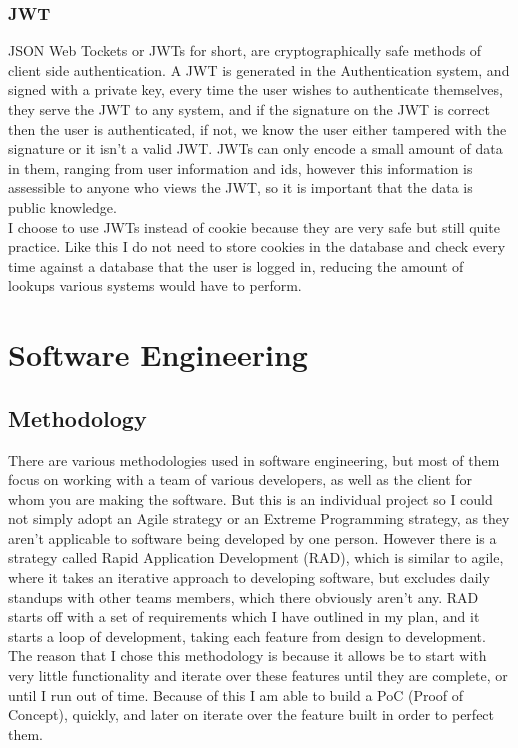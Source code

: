 \documentclass[titlepage]{article}
\begin{document}
\subsubsection{JWT}
JSON Web Tockets or JWTs for short, are cryptographically safe methods of client side authentication. A JWT is generated in the Authentication system, and signed with a private key, every time the user wishes to authenticate themselves, they serve the JWT to any system, and if the signature on the JWT is correct then the user is authenticated, if not, we know the user either tampered with the signature or it isn't a valid JWT. JWTs can only encode a small amount of data in them, ranging from user information and ids, however this information is assessible to anyone who views the JWT, so it is important that the data is public knowledge. \\

I choose to use JWTs instead of cookie because they are very safe but still quite practice. Like this I do not need to store cookies in the database and check every time against a database that the user is logged in, reducing the amount of lookups various systems would have to perform.

\section{Software Engineering}

\subsection{Methodology}
There are various methodologies used in software engineering, but most of them focus on working with a team of various developers, as well as the client for whom you are making the software. But this is an individual project so I could not simply adopt an Agile strategy or an Extreme Programming strategy, as they aren't applicable to software being developed by one person. However there is a strategy called Rapid Application Development (RAD), which is similar to agile, where it takes an iterative approach to developing software, but excludes daily standups with other teams members, which there obviously aren't any. RAD starts off with a set of requirements which I have outlined in my plan, and it starts a loop of development, taking each feature from design to development. The reason that I chose this methodology is because it allows be to start with very little functionality and iterate over these features until they are complete, or until I run out of time. Because of this I am able to build a PoC (Proof of Concept), quickly, and later on iterate over the feature built in order to perfect them.
\end{document}
